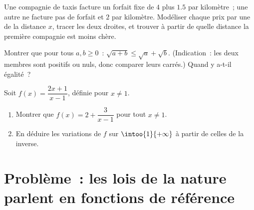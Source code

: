 \begin{exercise}[$\star\star$]\label{exo:g10:reffunc:8}
Une compagnie de taxis facture un forfait fixe de $4$ plus $1.5$ par
kilomètre~; une autre ne facture pas de forfait et $2$ par kilomètre.
Modéliser chaque prix par une  de la distance $x$, tracer
les deux droites, et trouver à partir de quelle distance la première
compagnie est moins chère.
\end{exercise}

\begin{exercise}[$\star\star$]\label{exo:g10:reffunc:9}
Montrer que pour tous $a, b \geq 0$~:
$\sqrt{a + b} \leq \sqrt a + \sqrt b$. (Indication~: les deux membres
sont positifs ou nuls, donc comparer leurs carrés.) Quand y a-t-il
égalité~?
\end{exercise}

\begin{exercise}[$\star\star\star$]\label{exo:g10:reffunc:10}
Soit $f(x) = \dfrac{2x + 1}{x - 1}$, définie pour $x \neq 1$.
\begin{enumerate}
  \item Montrer que $f(x) = 2 + \dfrac{3}{x - 1}$ pour tout $x \neq 1$.
  \item En déduire les variations de $f$ sur $\intoo{1}{+\infty}$ à
        partir de celles de la  inverse.
\end{enumerate}
\end{exercise}

\section{Problème~: les lois de la nature parlent en fonctions de
référence}

